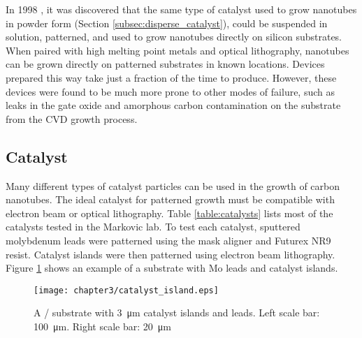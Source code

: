 In 1998 \cite{Kong1998a}, it was discovered that the same type of catalyst used to grow nanotubes in powder form (Section \ref{subsec:disperse_catalyst}), could be suspended in solution, patterned, and used to grow nanotubes directly on silicon substrates. When paired with high melting point metals and optical lithography, nanotubes can be grown directly on patterned substrates in known locations. Devices prepared this way take just a fraction of the time to produce. However, these devices were found to be much more prone to other modes of failure, such as leaks in the gate oxide and amorphous carbon contamination on the substrate from the CVD growth process.

\subsection{Catalyst} 

Many different types of catalyst particles can be used in the growth of carbon nanotubes. The ideal catalyst for patterned growth must be compatible with electron beam or optical lithography. Table \ref{table:catalysts} lists most of the catalysts tested in the Markovic lab. To test each catalyst, sputtered molybdenum leads were patterned using the mask aligner and Futurex NR9 resist. Catalyst islands were then patterned using electron beam lithography. Figure \ref{fig:catalyst_islands} shows an example of a substrate with Mo leads and catalyst islands.

\begin{figure}
	\centering
	\texttt{[image: chapter3/catalyst\_island.eps]}
	\caption{A / substrate with \SI{3}{\micro\meter} catalyst islands and  leads. Left scale bar: \SI{100}{\micro\meter}. Right scale bar: \SI{20}{\micro\meter} }
	\label{fig:catalyst_islands}
\end{figure}

